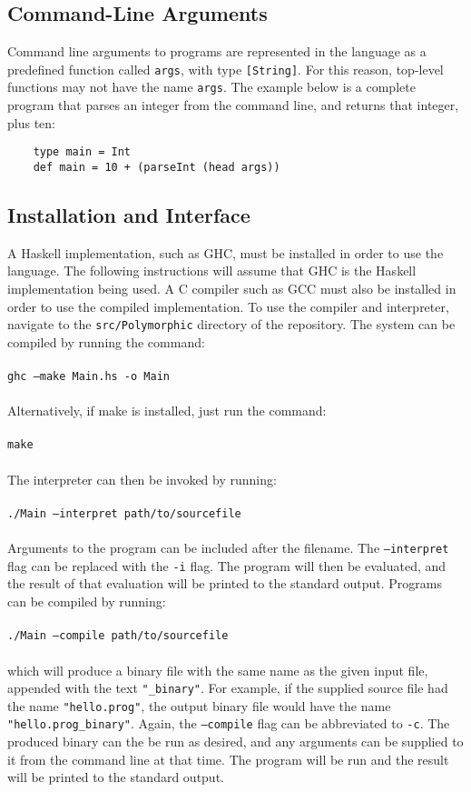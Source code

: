 \documentclass{article}
\begin{document}
\subsection{Command-Line Arguments}
Command line arguments to programs are represented in the language as a predefined function called \texttt{args}, with type \texttt{[String]}. For this reason, top-level functions may not have the name \texttt{args}. The example below is a complete program that parses an integer from the command line, and returns that integer, plus ten:
\begin{verbatim}
    type main = Int
    def main = 10 + (parseInt (head args))
\end{verbatim}
\subsection{Installation and Interface}
A Haskell implementation, such as GHC, must be installed in order to use the language. The following instructions will assume that GHC is the Haskell implementation being used. A C compiler such as GCC must also be installed in order to use the compiled implementation. To use the compiler and interpreter, navigate to the \texttt{src/Polymorphic} directory of the repository. The system can be compiled by running the command:
\\\\
\indent \texttt{ghc --make Main.hs -o Main}
\\\\
Alternatively, if make is installed, just run the command:
\\\\
\indent \texttt{make}
\\\\
The interpreter can then be invoked by running:
\\\\
\indent \texttt{./Main --interpret path/to/sourcefile}
\\\\
Arguments to the program can be included after the filename. The \texttt{--interpret} flag can be replaced with the \texttt{-i} flag. The program will then be evaluated, and the result of that evaluation will be printed to the standard output. Programs can be compiled by running:
\\\\
\indent \texttt{./Main --compile path/to/sourcefile}
\\\\
which will produce a binary file with the same name as the given input file, appended with the text \texttt{"\_binary"}. For example, if the supplied source file had the name \texttt{"hello.prog"}, the output binary file would have the name \texttt{"hello.prog\_binary"}. Again, the \texttt{--compile} flag can be abbreviated to \texttt{-c}. The produced binary can the be run as desired, and any arguments can be supplied to it from the command line at that time. The program will be run and the result will be printed to the standard output.
\pagebreak
\end{document}
